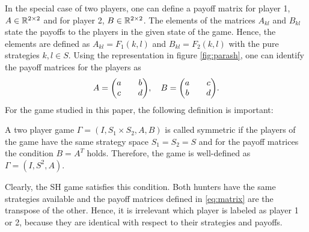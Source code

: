 In the special case of two players, one can define a payoff matrix for
player 1, $A \in \mathbb{R}^{2 \times2}$ and for player 2,
$B \in \mathbb{R}^{2 \times2}$. The elements of the matrices $A_{kl}$ and
$B_{kl}$ state the payoffs to the players in the given state of the
game. Hence, the elements are defined as $A_{kl}= F_1(k,l)$ and 
$B_{kl} =F_2(k,l)$ with the pure strategies $k,l \in S$.
Using the 
representation in figure \ref{fig:parash}, one can identify the 
payoff matrices for the players as
\begin{align}
     A = \mqty(a && b \\ c && d), \quad B = \mqty(a && c \\ b && d).
        \label{eq:matrix}
\end{align}
For the game studied in this paper, the following definition is important: 
\begin{mydef}
        A two player game $\Gamma=(I,S_1 \times S_2, A,B)$ is called symmetric
        if the players of the game have the same strategy space $S_1=S_2=S$ and
        for the payoff matrices the condition $B=A^T$ holds. Therefore, the
        game is well-defined as $\Gamma=(I,S^2,A)$.
        \label{symmetry}
\end{mydef}
Clearly, the SH game satisfies this condition. Both hunters have the same 
strategies available and the payoff matrices defined in 
\eqref{eq:matrix}  are the transpose of the other.
Hence, it is irrelevant which player is labeled as player 1 or 2, because 
they are identical with respect to their strategies and payoffs.

